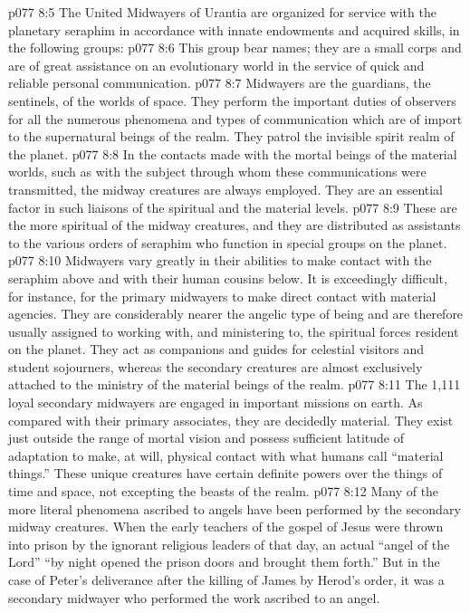 \vs p077 8:5 \pc The United Midwayers of Urantia are organized for service with the planetary seraphim in accordance with innate endowments and acquired skills, in the following groups:
\vs p077 8:6 \bibnobreakspace {} This group bear names; they are a small corps and are of great assistance on an evolutionary world in the service of quick and reliable personal communication.
\vs p077 8:7 \bibnobreakspace {} Midwayers are the guardians, the sentinels, of the worlds of space. They perform the important duties of observers for all the numerous phenomena and types of communication which are of import to the supernatural beings of the realm. They patrol the invisible spirit realm of the planet.
\vs p077 8:8 \bibnobreakspace {} In the contacts made with the mortal beings of the material worlds, such as with the subject through whom these communications were transmitted, the midway creatures are always employed. They are an essential factor in such liaisons of the spiritual and the material levels.
\vs p077 8:9 \bibnobreakspace {} These are the more spiritual of the midway creatures, and they are distributed as assistants to the various orders of seraphim who function in special groups on the planet.
\vs p077 8:10 \pc Midwayers vary greatly in their abilities to make contact with the seraphim above and with their human cousins below. It is exceedingly difficult, for instance, for the primary midwayers to make direct contact with material agencies. They are considerably nearer the angelic type of being and are therefore usually assigned to working with, and ministering to, the spiritual forces resident on the planet. They act as companions and guides for celestial visitors and student sojourners, whereas the secondary creatures are almost exclusively attached to the ministry of the material beings of the realm.
\vs p077 8:11 The 1,111 loyal secondary midwayers are engaged in important missions on earth. As compared with their primary associates, they are decidedly material. They exist just outside the range of mortal vision and possess sufficient latitude of adaptation to make, at will, physical contact with what humans call “material things.” These unique creatures have certain definite powers over the things of time and space, not excepting the beasts of the realm.
\vs p077 8:12 Many of the more literal phenomena ascribed to angels have been performed by the secondary midway creatures. When the early teachers of the gospel of Jesus were thrown into prison by the ignorant religious leaders of that day, an actual “angel of the Lord” “by night opened the prison doors and brought them forth.” But in the case of Peter’s deliverance after the killing of James by Herod’s order, it was a secondary midwayer who performed the work ascribed to an angel.
